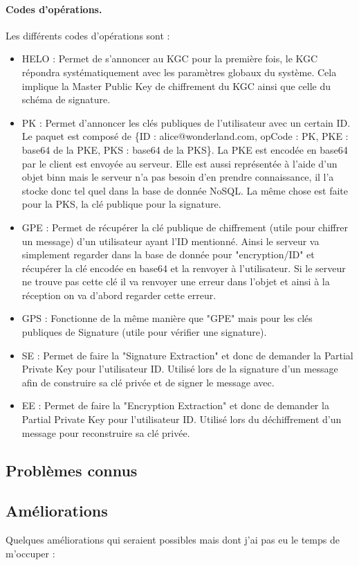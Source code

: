\paragraph*{Codes d'opérations.}
Les différents codes d'opérations sont :
\begin{itemize}
	\item HELO : Permet de s'annoncer au KGC pour la première fois, le KGC répondra systématiquement avec les paramètres globaux du système. Cela implique la Master Public Key de chiffrement du KGC ainsi que celle du schéma de signature. 
	\item PK : Permet d'annoncer les clés publiques de l'utilisateur avec un certain ID. Le paquet est composé de \{ID : alice@wonderland.com, opCode : PK, PKE : base64 de la PKE, PKS : base64 de la PKS\}. La PKE est encodée en base64 par le client est envoyée au serveur. Elle est aussi représentée à l'aide d'un objet binn mais le serveur n'a pas besoin d'en prendre connaissance, il l'a stocke donc tel quel dans la base de donnée NoSQL. La même chose est faite pour la PKS, la clé publique pour la signature.
	\item GPE : Permet de récupérer la clé publique de chiffrement (utile pour chiffrer un message) d'un utilisateur ayant l'ID mentionné. Ainsi le serveur va simplement regarder dans la base de donnée pour "encryption/ID" et récupérer la clé encodée en base64 et la renvoyer à l'utilisateur. Si le serveur ne trouve pas cette clé il va renvoyer une erreur dans l'objet et ainsi à la réception on va d'abord regarder cette erreur.
	\item GPS : Fonctionne de la même manière que "GPE" mais pour les clés publiques de Signature (utile pour vérifier une signature).
	\item SE : Permet de faire la "Signature Extraction" et donc de demander la Partial Private Key pour l'utilisateur ID. Utilisé lors de la signature d'un message afin de construire sa clé privée et de signer le message avec. 
	\item EE : Permet de faire la "Encryption Extraction" et donc de demander la Partial Private Key pour l'utilisateur ID. Utilisé lors du déchiffrement d'un message pour reconstruire sa clé privée.
\end{itemize}
\subsection{Problèmes connus}
\subsection{Améliorations}
Quelques améliorations qui seraient possibles mais dont j'ai pas eu le temps de m'occuper :
